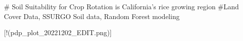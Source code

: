 # Soil Suitability for Crop Rotation is California's rice growing region
#Land Cover Data, SSURGO Soil data, Random Forest modeling



[!(pdp_plot_20221202_EDIT.png)]
